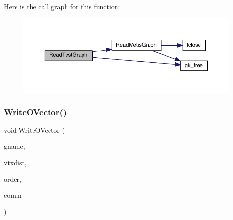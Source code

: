 Here is the call graph for this function\+:\nopagebreak
\begin{figure}[H]
\begin{center}
\leavevmode
\includegraphics[width=350pt]{a00861_a248f280836966f501ed8ecceb1b32a4a_cgraph}
\end{center}
\end{figure}
\mbox{\label{a00861_a9ff4864d8e906761bd6c55597c085e3b}} 
\subsubsection{\texorpdfstring{Write\+O\+Vector()}{WriteOVector()}}
{\footnotesize\ttfamily void Write\+O\+Vector (\begin{DoxyParamCaption}\item[{char $\ast$}]{gname,  }\item[{\hyperlink{a00876_aaa5262be3e700770163401acb0150f52}{idx\+\_\+t} $\ast$}]{vtxdist,  }\item[{\hyperlink{a00876_aaa5262be3e700770163401acb0150f52}{idx\+\_\+t} $\ast$}]{order,  }\item[{M\+P\+I\+\_\+\+Comm}]{comm }\end{DoxyParamCaption})}

